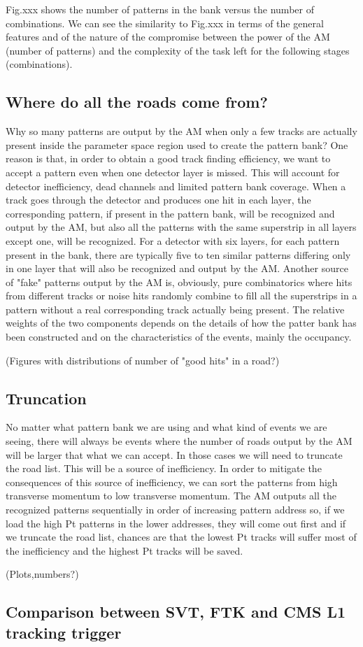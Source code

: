 Fig.xxx shows the number of patterns in the bank versus the number of combinations. We can see the similarity to Fig.xxx in terms of the general features and of the nature of the compromise between the power of the AM (number of patterns) and the complexity of the task left for the following stages (combinations). 


\subsection{Where do all the roads come from?}

Why so many patterns are output by the AM when only a few tracks are actually present inside the parameter space region used to create the pattern bank? One reason is that, in order to obtain a good track finding efficiency, we want to accept a pattern even when one detector layer is missed. This will account for detector inefficiency, dead channels and limited pattern bank coverage. When a track goes through the detector and produces one hit in each layer, the corresponding pattern, if present in the pattern bank, will be recognized and output by the AM,
but also all the patterns with the same superstrip in all layers except one, will be recognized.
For a detector with six layers, for each pattern present in the bank, there are typically five to  ten similar patterns differing only in one layer that will also be recognized and output by the AM. Another source of "fake" patterns output by the AM is, obviously, pure combinatorics where hits from different tracks or noise hits randomly combine to fill all the superstrips in a pattern without a real corresponding track actually being present. The relative weights of the two components depends on the details of how the patter bank has been constructed and on the characteristics of the events, mainly the occupancy. 

(Figures with distributions of number of "good hits" in a road?) 

\subsection{Truncation}

No matter what pattern bank we are using and what kind of events we are seeing, there will always be events where the number of roads output by the AM will be larger that what we can accept.
In those cases we will need to truncate the road list. This will be a source of inefficiency.
In order to mitigate the consequences of this source of inefficiency, we can sort the patterns from high transverse momentum to low transverse momentum. The AM outputs all the recognized patterns sequentially in order of increasing pattern address so, if we load the high Pt patterns in the lower addresses, they will come out first and if we truncate the road list, chances are that the lowest Pt tracks will suffer most of the inefficiency and the highest Pt tracks will be saved.

(Plots,numbers?)


\subsection{Comparison between SVT, FTK and CMS L1 tracking trigger }







